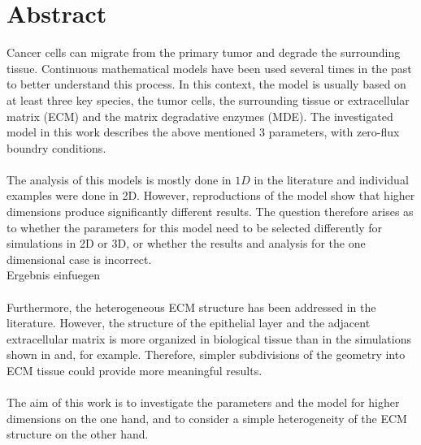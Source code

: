 \section*{Abstract}
Cancer cells can migrate from the primary tumor and degrade the surrounding tissue. Continuous mathematical models have been used several times in the past to better understand this process. In this context, the model is usually based on at least three key species, the tumor cells, the surrounding tissue or extracellular matrix (ECM) and the matrix degradative enzymes (MDE). The investigated model in this work describes the above mentioned 3 parameters, with zero-flux boundry conditions. \\ \\
The analysis of this models is mostly done in $1D$ in the literature and individual examples were done in 2D. However, reproductions of the model show that higher dimensions produce significantly different results. The question therefore arises as to whether the parameters for this model need to 
be selected differently for simulations in 2D or 3D, or whether the results and analysis for the one dimensional case is incorrect. \\
Ergebnis einfuegen\\ \\
Furthermore, the heterogeneous ECM structure has been addressed in the literature. However, the structure of the epithelial layer and the adjacent extracellular matrix is more organized in biological tissue than in the simulations shown in and, for example. Therefore, simpler subdivisions of the geometry into ECM tissue could provide more meaningful results. \\ \\
The aim of this work is to investigate the parameters and the model for higher dimensions on the one hand, and to consider a simple heterogeneity of the ECM structure on the other hand.